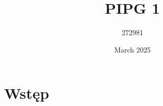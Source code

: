 \documentclass{article}
\title{PIPG 1}
\author{272981 }
\date{March 2025}
\begin{document}
\maketitle

\section{Wstęp}
\end{document}
